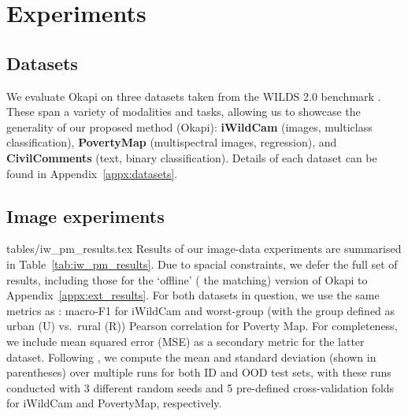 \section{Experiments}\label{sec:exps}
%
\subsection{Datasets}\label{sec:exps_datasets} 
%
We evaluate Okapi on three datasets taken from the WILDS 2.0 benchmark \citep{SagWeiLeeGaoetal22}. 
%
These span a variety of modalities and tasks, allowing us to showcase the generality of our
proposed method (Okapi): \textbf{iWildCam} (images, multiclass classification), \textbf{PovertyMap}
(multispectral images, regression), and \textbf{CivilComments} (text, binary classification). 
%
Details of each dataset can be found in Appendix~\ref{appx:datasets}.
%
\subsection{Image experiments}
%
{tables/iw_pm_results.tex}
%
Results of our image-data experiments are summarised in Table~\ref{tab:iw_pm_results}. 
%
Due to spacial constraints, we defer the full set of results, including those for the `offline'
(\wrt{} the matching) version of Okapi to Appendix~\ref{appx:ext_results}. 
%
For both datasets in question, we use the same metrics as \citet{SagWeiLeeGaoetal22}: macro-F1 for
iWildCam and worst-group (with the group defined as urban (U) vs.\ rural (R)) Pearson correlation
for Poverty Map. 
%
For completeness, we include mean squared error (MSE) as a secondary metric for the latter dataset.
%
Following \citet{SagWeiLeeGaoetal22}, we compute the mean and standard deviation (shown in
parentheses) over multiple runs for both \ac{ID} and \ac{OOD} test sets, with these runs conducted
with 3 different random seeds and 5 pre-defined cross-validation folds for iWildCam and PovertyMap,
respectively.

